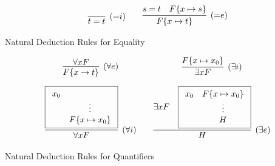 \begin{table}[hbt]
	\begin{gather*}
	\infer[({=}i)]{t=t}{}
	\qquad
	\infer[({=}e)]{F\{x\mapsto t\}}{s=t & F\{x\mapsto s\}}
	\end{gather*}
	\caption{Natural Deduction Rules for Equality}
	\label{tab:natural:deduction:equality}
\end{table}

\begin{table}[hbt]
	\begin{gather*}
	\begin{array}{ccc}
	\infer[(\forall e)]{F\{x\to t\}}{
		\forall x F
	}
	&&
		\infer[(\exists i)]{\exists x F}{
		F\{x\mapsto x_0 \}
	}
	\\[1em]
	\infer[(\forall i)]{\forall x F}{
		\boxed{\begin{array}{cc}x_0\\&\vdots\\&F\{x\mapsto x_0\}\end{array}}
	}
	&&
	\infer[(\exists e)]{H}{
		\exists x F &
		\boxed{\begin{array}{cc}x_0&F\{x\mapsto x_0 \}\\&\vdots\\&H\end{array}}
	}
	\end{array}
	\end{gather*}
	\caption{Natural Deduction Rules for Quantifiers}
	\label{tab:natural:deduction:quantifiers}
\end{table}